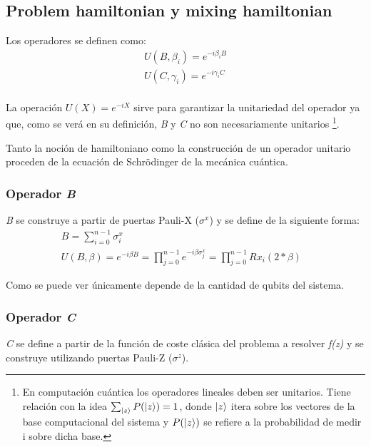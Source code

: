 \documentclass{article}
\begin{document}
\subsection{Problem hamiltonian y mixing hamiltonian}

Los operadores se definen como:
\begin{align*}
  U(B, \beta_i) = e^{-i \beta_i B} \\
  U(C, \gamma_i) = e^{-i \gamma_i C} \\
\end{align*}

La operación \(U(X) = e^{-i X}\) sirve para garantizar la unitariedad del operador ya que, como se verá en su definición, \textit{B} y \textit{C} no son necesariamente unitarios
\footnote{En computación cuántica los operadores lineales deben ser unitarios. Tiene relación con la idea
  $\sum_{\ket{z}} {P(\ket{z})} = 1$,
  donde $\ket{z}$ itera sobre los vectores de la base computacional del sistema y
  \(P(\ket{z})\) se refiere a la probabilidad de medir i sobre dicha base.}.

Tanto la noción de hamiltoniano como la construcción de un operador unitario proceden de la ecuación de Schrödinger de la mecánica cuántica.

\subsubsection{Operador \textit{B}}
\textit{B} se construye a partir de puertas Pauli-X ($\sigma^x$) y se define de la siguiente forma:
\begin{align*}
  &B = \sum_{i=0}^{n-1}\sigma^x_{i} &&\\
  &U(B, \beta) = e^{-i \beta B} = \prod_{j=0}^{n-1}e^{-i \beta \sigma^x_j} = \prod_{j=0}^{n-1}Rx_i(2*\beta)  %
\end{align*}

Como se puede ver únicamente depende de la cantidad de qubits del sistema.

\subsubsection{Operador \textit{C}}
\textit{C} se define a partir de la función de coste clásica del problema a resolver \textit{f(z)} y se construye utilizando puertas Pauli-Z ($\sigma^z$).
\end{document}
